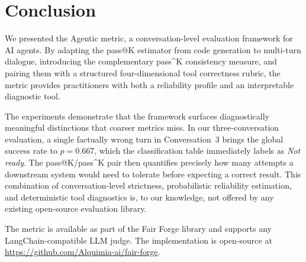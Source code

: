 \documentclass[11pt,a4paper]{article}
\begin{document}
\section{Conclusion}

We presented the Agentic metric, a conversation-level evaluation framework
for AI agents. By adapting the pass@K estimator from code generation to
multi-turn dialogue, introducing the complementary pass\^{}K consistency
measure, and pairing them with a structured four-dimensional tool correctness
rubric, the metric provides practitioners with both a reliability profile and
an interpretable diagnostic tool.

The experiments demonstrate that the framework surfaces diagnostically
meaningful distinctions that coarser metrics miss. In our three-conversation
evaluation, a single factually wrong turn in Conversation~3 brings the global
success rate to $p = 0.667$, which the classification table immediately
labels as \emph{Not ready}. The pass@K/pass\^{}K pair then quantifies
precisely how many attempts a downstream system would need to tolerate before
expecting a correct result. This combination of conversation-level strictness,
probabilistic reliability estimation, and deterministic tool diagnostics is,
to our knowledge, not offered by any existing open-source evaluation library.

The metric is available as part of the Fair Forge library and supports any
LangChain-compatible LLM judge. The implementation is open-source at
\url{https://github.com/Alquimia-ai/fair-forge}.



\end{document}
